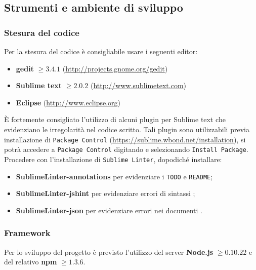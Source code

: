 
\subsection{Strumenti e ambiente di sviluppo}
		
		\subsubsection{Stesura del codice}
		
		Per la stesura del codice è consigliabile usare i seguenti editor:
		\begin{itemize}
			\item \textbf{gedit} $\geq 3.4.1$ (\url{http://projects.gnome.org/gedit})
		    \item \textbf{Sublime text} $\geq 2.0.2$ (\url{http://www.sublimetext.com})
			\item \textbf{Eclipse} (\url{http://www.eclipse.org})
		\end{itemize}

        \`E fortemente consigliato l'utilizzo di alcuni plugin per Sublime text che evidenziano le irregolarità nel codice scritto. Tali plugin sono utilizzabili previa installazione di \texttt{Package Control} (\url{https://sublime.wbond.net/installation}), si potrà accedere a \texttt{Package Control} digitando  e selezionando \texttt{Install Package}. Procedere con l'installazione di \texttt{Sublime Linter}, dopodiché installare:
        \begin{itemize}
            \item \textbf{SublimeLinter-annotations} per evidenziare i \texttt{TODO} e \texttt{README};
            \item \textbf{SublimeLinter-jshint} per evidenziare errori di sintassi ;
            \item \textbf{SublimeLinter-json} per evidenziare errori nei documenti .
        \end{itemize}
		
		\subsubsection{Framework}
		
		Per lo sviluppo del progetto è previsto l'utilizzo del server \textbf{Node.js} $\geq 0.10.22$ e del relativo  \textbf{npm} $\geq 1.3.6$.